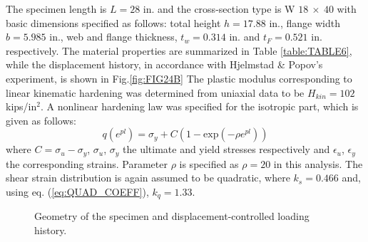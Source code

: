 The specimen length is $L=28$ in. and the cross-section type is W $18\ \times\ 
40$ with basic dimensions 
specified as follows: total height $h=17.88$ in., flange width $b=5.985$ in., 
web and flange thickness, $t_w=0.314$ in. and $t_F=0.521$ in. respectively. The 
material properties are summarized in Table \ref{table:TABLE6}, while the 
displacement history, in 
accordance with Hjelmstad \& Popov's experiment, is shown in 
Fig.\ref{fig:FIG24B} The plastic 
modulus corresponding to linear kinematic hardening was determined from  
uniaxial data to be $H_{kin}=102$ kips/in${}^2$. A nonlinear hardening law was 
specified for the isotropic part, which is given as follows:
\begin{equation}
	q(e^{pl}) = \sigma_y + C(1-\text{exp}(-\rho e^{pl}))
	\label{eq:NONLIN_ISOTROPIC_HARD}
\end{equation}
\noindent where $C=\sigma_u-\sigma_y$, $\sigma_u$, $\sigma_y$ the ultimate and 
yield stresses respectively and $\epsilon_u$, $\epsilon_y$ the corresponding 
strains. Parameter $\rho$ is specified as 
$\rho=20$ in this analysis. The shear strain distribution is again assumed to 
be quadratic, where $k_s=0.466$ and, using eq. (\ref{eq:QUAD_COEFF}),  
$k_q=1.33$.

\begin{figure}[t]
	\centering
	\caption{Geometry of the specimen and displacement-controlled loading 
		history.}
	\label{fig:FIG24}
\end{figure} 

